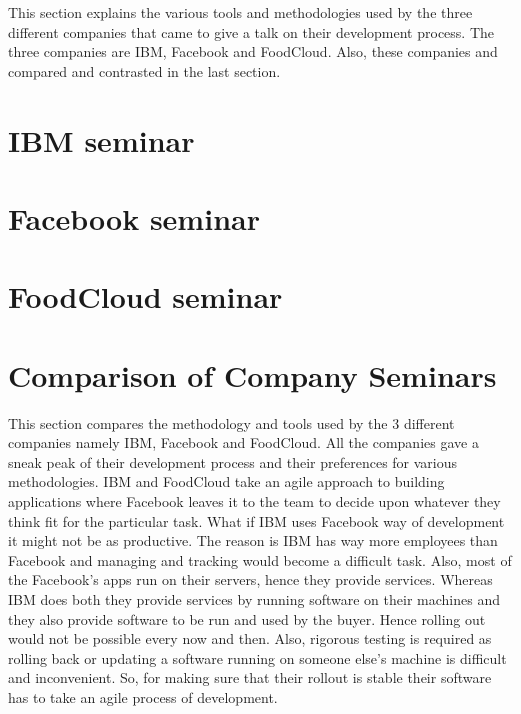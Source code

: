 This section explains the various tools and methodologies used by the three different companies that came to give a talk on their development process. The three companies are IBM, Facebook and FoodCloud. Also, these companies and compared and contrasted in the last section.

\section{IBM seminar}


\section{Facebook seminar}


\section{FoodCloud seminar}


\section{Comparison of Company Seminars}
This section compares the methodology and tools used by the 3 different companies namely IBM, Facebook and FoodCloud. All the companies gave a sneak peak of their development process and their preferences for various methodologies. IBM and FoodCloud take an agile approach to building applications where Facebook leaves it to the team to decide upon whatever they think fit for the particular task. What if IBM uses Facebook way of development it might not be as productive. The reason is IBM has way more employees than Facebook and managing and tracking would become a difficult task. Also, most of the Facebook's apps run on their servers, hence they provide services. Whereas IBM does both they provide services by running software on their machines and they also provide software to be run and used by the buyer. Hence rolling out would not be possible every now and then. Also, rigorous testing is required as rolling back or updating a software running on someone else's machine is difficult and inconvenient. So, for making sure that their rollout is stable their software has to take an agile process of development.

